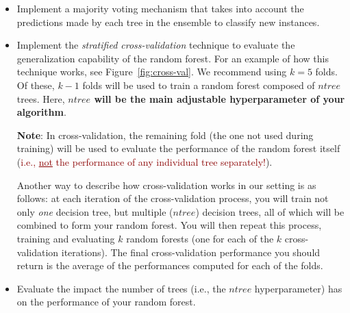 \documentclass{article}
\begin{document}
\begin{itemize}
\item Implement a majority voting mechanism that takes into account the predictions made by each tree in the ensemble to classify new instances.
\item Implement the \textit{stratified cross-validation} technique to evaluate the generalization capability of the random forest. For an example of how this technique works, see Figure~\ref{fig:cross-val}. We recommend using $k=5$ folds. Of these, $k-1$ folds will be used to train a random forest composed of $ntree$ trees. Here, \textbf{$ntree$ will be the main adjustable hyperparameter of your algorithm}. 
%
\begin{mybox}[boxpink] 
\textbf{Note}:
In cross-validation, the remaining fold (the one not used during training) will be used to evaluate the performance of the random forest itself (\textcolor{darkred}{i.e., \underline{not} the performance of any individual tree separately!}). 
\end{mybox}
%
Another way to describe how cross-validation works in our setting is as follows: at each iteration of the cross-validation process, you will train not only \textit{one} decision tree, but multiple ($ntree$) decision trees, all of which will be combined to form your random forest. You will then repeat this process, training and evaluating $k$ random forests (one for each of the $k$ cross-validation iterations). The final cross-validation performance you should return is the average of the performances computed for each of the folds.
\item Evaluate the impact the number of trees (i.e., the $ntree$ hyperparameter) has on the performance of your random forest.
%
\end{itemize}


\newpage
\vspace{2cm}
\end{document}
